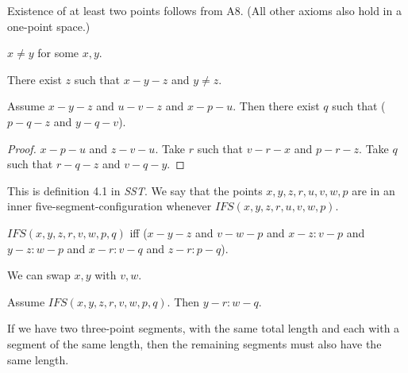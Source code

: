\documentclass{article}
\begin{document}
  Existence of at least two points follows from A8. (All other axioms also hold in a one-point space.)

  \begin{forthel}
    \begin{lemma}[L3o13]
      $x \neq y$ for some $x, y$.
    \end{lemma}

    \begin{lemma}[L3o14]
      There exist $z$ such that $x-y-z$ and $y \neq z$.
    \end{lemma}

    \begin{lemma}[L3o17]
      Assume $x-y-z$ and $u-v-z$ and $x-p-u$. Then there exist $q$ such that ($p-q-z$ and $y-q-v$).
    \end{lemma}
    \begin{proof}
      $x-p-u$ and $z-v-u$.
    	Take $r$ such that $v-r-x$ and $p-r-z$. %
    	Take $q$ such that $r-q-z$ and $v-q-y$. %
    \end{proof}
  \end{forthel}


  This is definition 4.1 in \textit{SST}.
  We say that the points $x,y,z,r,u,v,w,p$ are
  in an inner five-segment-configuration
  whenever $IFS(x,y,z,r,u,v,w,p)$.

  \begin{forthel}
    \begin{definition}[IFS]
      $IFS(x,y,z,r,v,w,p,q)$ iff ($x-y-z$ and $v-w-p$ and $x-z : v-p$ and $y-z : w-p$ and $x-r : v-q$ and $z-r : p-q$).
    \end{definition}
  \end{forthel}

  We can swap $x, y$ with $v, w$.

  \begin{forthel}
    \begin{axiom}[L4o2]
      Assume $IFS(x,y,z,r,v,w,p,q)$. Then $y-r : w-q$.
    \end{axiom}
  \end{forthel}

  If we have two three-point segments, with the same total length and each with a segment of the same length, then the remaining segments must also have the same length.

\end{document}
